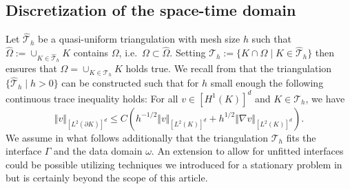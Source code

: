 \documentclass[sn-mathphys-num]{sn-jnl}
\numberwithin{equation}{section}
\begin{document}
\subsection{Discretization of the space-time domain}\label{sec:spaceTimeDiscretization}
Let $\hat{\mathcal{T}}_h$ be a quasi-uniform triangulation with mesh size $h$ such that $\hat{\Omega}:= \cup_{K \in \hat{\mathcal{T}}_h} K $ contains $\Omega$, i.e.\ $\Omega \subset \hat{\Omega}$. Setting $\mathcal{T}_h := \{ K \cap \Omega \mid K \in  \hat{\mathcal{T}}_h \}$ then ensures that $\Omega = \cup_{K \in \mathcal{T}_h} K$ holds true.  
We recall from  \cite[Sec. 4.2]{BFMO21control} that the triangulation $\{ \hat{\mathcal{T}}_h \mid h > 0 \}$ can be constructed such that for $h$ small enough the following continuous trace inequality holds:  For all $v \in [H^1(K)]^d$ and $K \in \mathcal{T}_h$, we have
\begin{equation}\label{eq:traceInequality}
    \Vert v \Vert_{[L^2(\partial K)]^d} \le C \left(h^{-1/2} \Vert v \Vert_{[L^2(K)]^d} + h^{1/2} \Vert \nabla v \Vert_{[L^2(K)]^d} \right).  
\end{equation}
We assume in what follows additionally that the triangulation $\mathcal{T}_h$ fits the interface $\Gamma$ and the data domain $\omega$. An extension to allow for unfitted interfaces could be possible utilizing techniques we introduced for a stationary problem in \cite{BP23arxiv} but is certainly beyond the scope of this article. 
\end{document}
